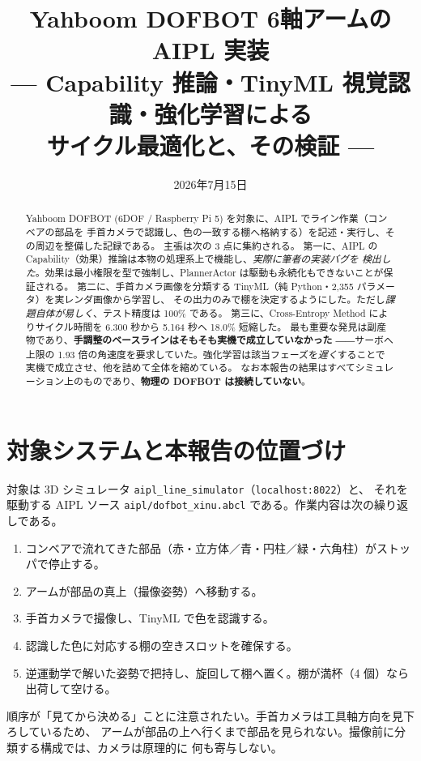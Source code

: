 \documentclass[11pt,a4paper]{article}
\title{\bfseries Yahboom DOFBOT 6軸アームの AIPL 実装\\
\large --- Capability 推論・TinyML 視覚認識・強化学習による\\サイクル最適化と、その検証 ---}
\author{}
\date{2026年7月15日}
\begin{document}
\maketitle

\begin{abstract}
\noindent
Yahboom DOFBOT (6DOF / Raspberry Pi 5) を対象に、AIPL でライン作業（コンベアの部品を
手首カメラで認識し、色の一致する棚へ格納する）を記述・実行し、その周辺を整備した記録である。
主張は次の 3 点に集約される。
第一に、AIPL の Capability（効果）推論は本物の処理系上で機能し、\emph{実際に筆者の実装バグを
検出した}。効果は最小権限を型で強制し、PlannerActor は駆動も永続化もできないことが保証される。
第二に、手首カメラ画像を分類する TinyML（純 Python・2{,}355 パラメータ）を実レンダ画像から学習し、
その出力のみで棚を決定するようにした。ただし\emph{課題自体が易しく}、テスト精度は 100\% である。
第三に、Cross-Entropy Method によりサイクル時間を 6.300 秒から 5.164 秒へ 18.0\% 短縮した。
最も重要な発見は副産物であり、\textbf{手調整のベースラインはそもそも実機で成立していなかった}
――サーボへ上限の 1.93 倍の角速度を要求していた。強化学習は該当フェーズを\emph{遅く}することで
実機で成立させ、他を詰めて全体を縮めている。
なお本報告の結果はすべてシミュレーション上のものであり、\textbf{物理の DOFBOT は接続していない}。
\end{abstract}

\section{対象システムと本報告の位置づけ}

対象は 3D シミュレータ \texttt{aipl\_line\_simulator}（\texttt{localhost:8022}）と、
それを駆動する AIPL ソース \texttt{aipl/dofbot\_xinu.abcl} である。作業内容は次の繰り返しである。

\begin{enumerate}[leftmargin=1.6em,itemsep=1pt]
  \item コンベアで流れてきた部品（赤・立方体／青・円柱／緑・六角柱）がストッパで停止する。
  \item アームが部品の真上（撮像姿勢）へ移動する。
  \item 手首カメラで撮像し、TinyML で色を認識する。
  \item 認識した色に対応する棚の空きスロットを確保する。
  \item 逆運動学で解いた姿勢で把持し、旋回して棚へ置く。棚が満杯（4 個）なら出荷して空ける。
\end{enumerate}

順序が「見てから決める」ことに注意されたい。手首カメラは工具軸方向を見下ろしているため、
アームが部品の上へ行くまで部品を見られない。撮像前に分類する構成では、カメラは原理的に
何も寄与しない。
\end{document}

